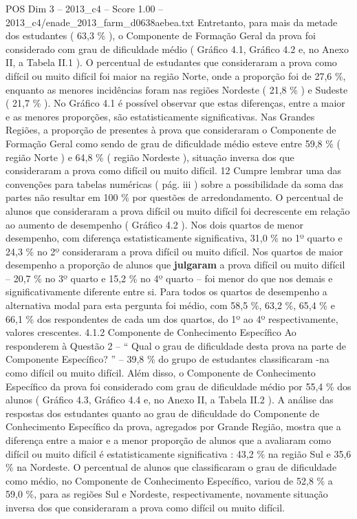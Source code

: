 \begin{textsample}{POS Dim 3 – 2013\_c4 – Score 1.00 – 2013\_c4/enade\_2013\_farm\_d0638aebea.txt}
Entretanto, para mais da metade dos estudantes ( 63,3 \% ), o Componente de Formação Geral da prova foi considerado com grau de dificuldade médio ( Gráfico 4.1, Gráfico 4.2 e, no Anexo II, a Tabela II.1 ).
O percentual de estudantes que consideraram a prova como difícil ou muito difícil foi maior na região Norte, onde a proporção foi de 27,6 \%, enquanto as menores incidências foram nas regiões Nordeste ( 21,8 \% ) e Sudeste ( 21,7 \% ).
No Gráfico 4.1 é possível observar que estas diferenças, entre a maior e as menores proporções, são estatisticamente significativas.
Nas Grandes Regiões, a proporção de presentes à prova que consideraram o Componente de Formação Geral como sendo de grau de dificuldade médio esteve entre 59,8 \% ( região Norte ) e 64,8 \% ( região Nordeste ), situação inversa dos que consideraram a prova como difícil ou muito difícil. 12 Cumpre lembrar uma das convenções para tabelas numéricas ( pág. iii ) sobre a possibilidade da soma das partes não resultar em 100 \% por questões de arredondamento.
O percentual de alunos que consideraram a prova difícil ou muito difícil foi decrescente em relação ao aumento de desempenho ( Gráfico 4.2 ).
Nos dois quartos de menor desempenho, com diferença estatisticamente significativa, 31,0 \% no 1º quarto e 24,3 \% no 2º consideraram a prova difícil ou muito difícil.
Nos quartos de maior desempenho a proporção de alunos que \textbf{julgaram} a prova difícil ou muito difícil – 20,7 \% no 3º quarto e 15,2 \% no 4º quarto – foi menor do que nos demais e significativamente diferente entre si.
Para todos os quartos de desempenho a alternativa modal para esta pergunta foi médio, com 58,5 \%, 63,2 \%, 65,4 \% e 66,1 \% dos respondentes de cada um dos quartos, do 1º ao 4º respectivamente, valores crescentes. 4.1.2 Componente de Conhecimento Específico Ao responderem à Questão 2 – “ Qual o grau de dificuldade desta prova na parte de Componente Específico? ” – 39,8 \% do grupo de estudantes classificaram -na como difícil ou muito difícil.
Além disso, o Componente de Conhecimento Específico da prova foi considerado com grau de dificuldade médio por 55,4 \% dos alunos ( Gráfico 4.3, Gráfico 4.4 e, no Anexo II, a Tabela II.2 ).
A análise das respostas dos estudantes quanto ao grau de dificuldade do Componente de Conhecimento Específico da prova, agregados por Grande Região, mostra que a diferença entre a maior e a menor proporção de alunos que a avaliaram como difícil ou muito difícil é estatisticamente significativa : 43,2 \% na região Sul e 35,6 \% na Nordeste.
O percentual de alunos que classificaram o grau de dificuldade como médio, no Componente de Conhecimento Específico, variou de 52,8 \% a 59,0 \%, para as regiões Sul e Nordeste, respectivamente, novamente situação inversa dos que consideraram a prova como difícil ou muito difícil.

\end{textsample}
